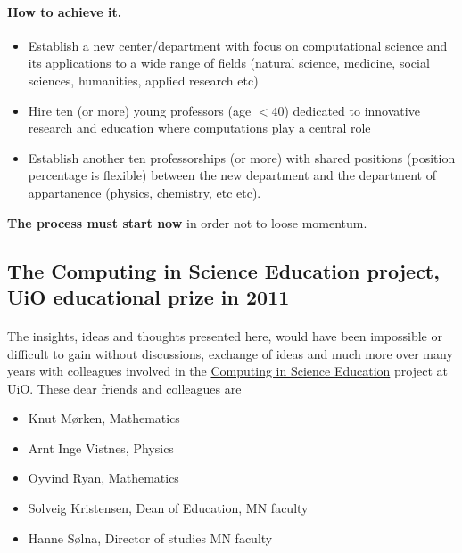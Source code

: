 \documentclass[%
oneside,                 %
final,                   %
10pt]{article}
\begin{document}
\noindent




\paragraph{How to achieve it.}
\begin{itemize}
\item Establish  a new center/department with focus on computational science and its applications to a wide range of fields (natural science, medicine, social sciences, humanities, applied research etc)

\item Hire ten (or more) young professors (age $< 40$) dedicated to innovative research and education where computations play a central role

\item Establish another ten professorships (or more) with  shared positions (position percentage  is flexible) between the  new department and the department of appartanence (physics, chemistry, etc etc).
\end{itemize}

\noindent



\textbf{The process must start now} in order not to loose momentum.



\subsection{The Computing in Science Education project, UiO educational prize in 2011}

\paragraph{}
The insights, ideas and thoughts presented here, would have been impossible or difficult to gain without discussions, exchange of ideas and much more over many years with colleagues involved in the \href{{http://www.mn.uio.no/english/about/collaboration/cse/}}{Computing in Science Education} project at UiO. These dear friends and colleagues  are 
\begin{itemize}
\item Knut Mørken, Mathematics

\item Arnt Inge Vistnes, Physics

\item Oyvind Ryan, Mathematics

\item Solveig Kristensen, Dean of Education, MN faculty

\item Hanne Sølna, Director of studies MN faculty
\end{itemize}

\noindent












\printindex
\end{document}
